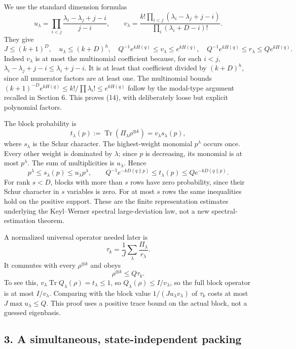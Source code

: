 \documentclass[11pt]{article}
\begin{document}
We use the standard dimension formulas \[
 u_\lambda=\prod_{i<j}\frac{\lambda_i-\lambda_j+j-i}{j-i},\qquad
 v_\lambda=\frac{k!\prod_{i<j}(\lambda_i-\lambda_j+j-i)}
                       {\prod_i(\lambda_i+D-i)!}.
 \tag{13}
\] They give \[
 J\le(k+1)^D,\quad u_\lambda\le(k+D)^h,\quad
 Q^{-1}e^{kH(q)}\le v_\lambda\le e^{kH(q)},\quad
 Q^{-1}e^{kH(q)}\le r_\lambda\le Qe^{kH(q)}.
 \tag{14}
\] Indeed \(v_\lambda\) is at most the multinomial coefficient because, for each \(i<j\), \(\lambda_i-\lambda_j+j-i\le\lambda_i+j-i\). It is at least that coefficient divided by \((k+D)^h\), since all numerator factors are at least one. The multinomial bounds \((k+1)^{-D}e^{kH(q)}\le k!/\prod\lambda_i!\le e^{kH(q)}\) follow by the modal-type argument recalled in Section 6. This proves (14), with deliberately loose but explicit polynomial factors.

The block probability is \[
 t_\lambda(p):=\operatorname{Tr}(\Pi_\lambda\rho^{\otimes k})
             =v_\lambda s_\lambda(p),
 \tag{15}
\] where \(s_\lambda\) is the Schur character. The highest-weight monomial \(p^\lambda\) occurs once. Every other weight is dominated by \(\lambda\); since \(p\) is decreasing, its monomial is at most \(p^\lambda\). The sum of multiplicities is \(u_\lambda\). Hence \[
 p^\lambda\le s_\lambda(p)\le u_\lambda p^\lambda,\qquad
 Q^{-1}e^{-kD(q\|p)}\le t_\lambda(p)\le Qe^{-kD(q\|p)}.
 \tag{16}
\] For rank \(s<D\), blocks with more than \(s\) rows have zero probability, since their Schur character in \(s\) variables is zero. For at most \(s\) rows the same inequalities hold on the positive support. These are the finite representation estimates underlying the Keyl--Werner spectral large-deviation law, not a new spectral-estimation theorem.

A normalized universal operator needed later is \[
 \tau_k=\frac1J\sum_\lambda\frac{\Pi_\lambda}{r_\lambda}.
 \tag{17}
\] It commutes with every \(\rho^{\otimes k}\) and obeys \[
 \rho^{\otimes k}\le Q\tau_k.
 \tag{18}
\] To see this, \(v_\lambda\operatorname{Tr}Q_\lambda(\rho)=t_\lambda\le1\), so \(Q_\lambda(\rho)\le I/v_\lambda\), so the full block operator is at most \(I/v_\lambda\). Comparing with the block value \(1/(Ju_\lambda v_\lambda)\) of \(\tau_k\) costs at most \(J\max u_\lambda\le Q\). This proof uses a positive trace bound on the actual block, not a guessed eigenbasis.

\hypertarget{a-simultaneous-state-independent-packing}{%
\subsection{3. A simultaneous, state-independent packing}\label{a-simultaneous-state-independent-packing}}
\end{document}
